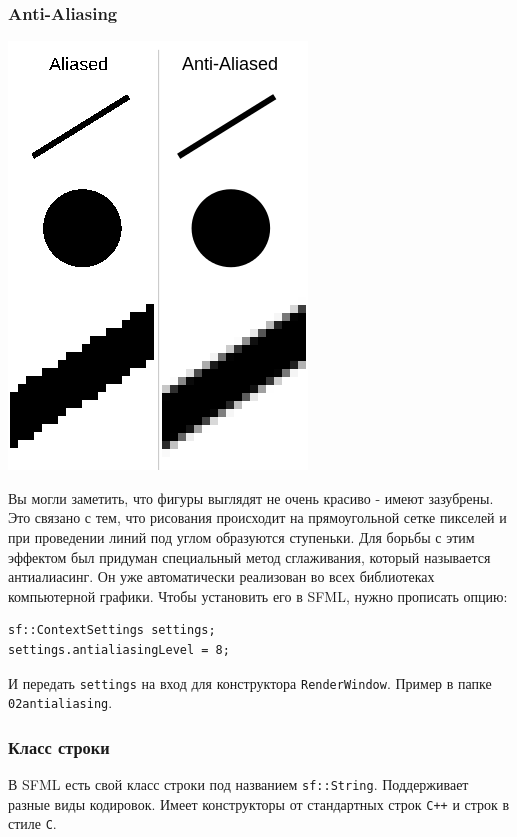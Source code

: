 \documentclass{article}
\begin{document}
\subsubsection*{Anti-Aliasing}
\begin{multicols}{2}
\begin{center}
\includegraphics[scale=0.5]{../images/anti-aliasing.png}
\end{center}
Вы могли заметить, что фигуры выглядят не очень красиво - имеют зазубрены. Это связано с тем, что рисования происходит на прямоугольной сетке пикселей и при проведении линий под углом образуются ступеньки. Для борьбы с этим эффектом был придуман специальный метод сглаживания, который называется антиалиасинг. Он уже автоматически реализован во всех библиотеках компьютерной графики. Чтобы установить его в SFML, нужно прописать опцию:
\begin{lstlisting}
sf::ContextSettings settings;
settings.antialiasingLevel = 8;
\end{lstlisting}
И передать \texttt{settings} на вход для конструктора \texttt{RenderWindow}. Пример в папке \texttt{02antialiasing}.
\end{multicols}


\subsubsection*{Класс строки}
В SFML есть свой класс строки под названием \texttt{sf::String}. Поддерживает разные виды кодировок. Имеет конструкторы от стандартных строк \texttt{C++} и строк в стиле \texttt{C}.
\end{document}
